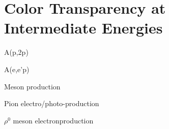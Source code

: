 \section{Color Transparency at Intermediate Energies}
\label{sec:ct_intermediate_energies}
A(p,2p)

A(e,e'p)

Meson production

Pion electro/photo-production

$\rho^0$ meson electronproduction
